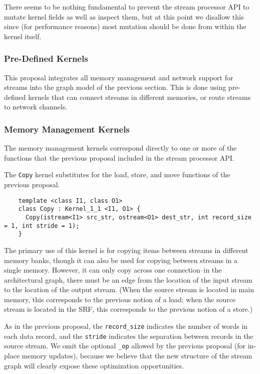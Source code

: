There seems to be nothing fundamental to prevent the stream processor
API to mutate kernel fields as well as inspect them, but at this point
we disallow this since (for performance reasons) most mutation should
be done from within the kernel itself.

\subsubsection{Pre-Defined Kernels}
\label{sec:predef}

This proposal integrates all memory management and network support for
streams into the graph model of the previous section.  This is done
using pre-defined kernels that can connect streams in different
memories, or route streams to network channels.

\subsubsection*{Memory Management Kernels}

The memory management kernels correspond directly to one or more of
the functions that the previous proposal included in the stream
processor API.

 The {\tt Copy} kernel substitutes for the load, store, and move
functions of the previous proposal.
{\small
\begin{verbatim}
    template <class I1, class O1>
    class Copy : Kernel_1_1 <I1, O1> {
      Copy(istream<I1> src_str, ostream<O1> dest_str, int record_size = 1, int stride = 1);
    }  
\end{verbatim}}

The primary use of this kernel is for copying items between streams in
different memory banks, though it can also be used for copying between
streams in a single memory.  However, it can only copy across one
connection--in the architectural graph, there must be an edge from the
location of the input stream to the location of the output stream.
(When the source stream is located in main memory, this corresponds to
the previous notion of a load; when the source stream is located in
the SRF, this corresponds to the previous notion of a store.)

As in the previous proposal, the {\tt record\_size} indicates the
number of words in each data record, and the {\tt stride} indicates
the separation between records in the source stream.  We omit the
optional {\tt \_op} allowed by the previous proposal (for in-place
memory updates), because we believe that the new structure of the
stream graph will clearly expose these optimization opportunities.

